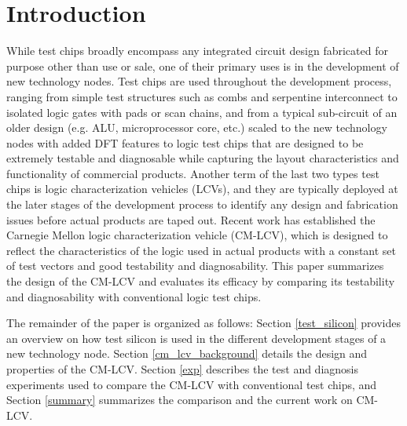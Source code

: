 \documentclass[journal]{IEEEtran}
\begin{document}
%
\IEEEpeerreviewmaketitle



\section{Introduction}

While test chips broadly encompass any integrated circuit design fabricated for purpose other than use or sale, one of their primary uses is in the development of new technology nodes. Test chips are used throughout the development process, ranging from simple test structures \cite{test_struct_1} such as combs and serpentine interconnect to isolated logic gates with pads or scan chains, and from a typical sub-circuit of an older design (e.g. ALU, microprocessor core, etc.) scaled to the new technology nodes with added DFT features to logic test chips that are designed to be extremely testable and diagnosable while capturing the layout characteristics and functionality of commercial products. Another term of the last two types test chips is logic characterization vehicles (LCVs), and they are typically deployed at the later stages of the development process to identify any design and fabrication issues before actual products are taped out. Recent work has established the Carnegie Mellon logic characterization vehicle (CM-LCV), which is designed to reflect the characteristics of the logic used in actual products with a constant set of test vectors and good testability and diagnosability. This paper summarizes the design of the CM-LCV and evaluates its efficacy by comparing its testability and diagnosability with conventional logic test chips.

The remainder of the paper is organized as follows: Section \ref{test_silicon} provides an overview on how test silicon is used in the different development stages of a new technology node. Section \ref{cm_lcv_background} details the design and properties of the CM-LCV. Section \ref{exp} describes the test and diagnosis experiments used to compare the CM-LCV with conventional test chips, and Section \ref{summary} summarizes the comparison and the current work on CM-LCV.
\end{document}
